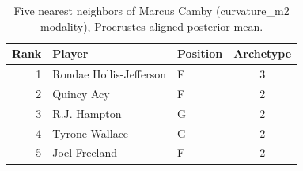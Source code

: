 \begin{table}[htbp]
  \centering\small
  \begin{tabular}{rllc}
    \toprule
    Rank & Player & Position & Archetype \\
    \midrule
    1 & Rondae Hollis-Jefferson & F & 3 \\
    2 & Quincy Acy & F & 2 \\
    3 & R.J. Hampton & G & 2 \\
    4 & Tyrone Wallace & G & 2 \\
    5 & Joel Freeland & F & 2 \\
    \bottomrule
  \end{tabular}
  \caption{Five nearest neighbors of Marcus Camby (curvature_m2 modality), Procrustes-aligned posterior mean.}
  \label{tab:Marcus_Camby_neighbors_curvature_m2}
\end{table}

